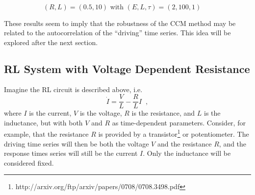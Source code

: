 \documentclass[a4paper,11pt]{article}
\begin{document}
\begin{figure}[h!t]
\begin{subfigure}[b]{0.4\textwidth}
\caption{$(R,L) = (0.5,10)$ with $\left(E,L,\tau\right)=\left(2,100,1\right)$}
\end{subfigure}
\caption{}
\end{figure}
 
These results seem to imply that the robustness of the CCM method may be related to the autocorrelation of the ``driving'' time series.  This idea will be explored after the next section.

\subsection{RL System with Voltage Dependent Resistance}
Imagine the RL circuit is described above, i.e.\
$$
\dot{I} = \frac{V}{L} - \frac{R}{L} I\;\;,
$$
where $I$ is the current, $V$ is the voltage, $R$ is the resistance, and $L$ is the inductance, but with both $V$ and $R$ as time-dependent parameters.  Consider, for example, that the resistance $R$ is provided by a transistor\footnote{http://arxiv.org/ftp/arxiv/papers/0708/0708.3498.pdf} or potentiometer.  The driving time series will then be both the voltage $V$ and the resistance $R$, and the response times series will still be the current $I$.  Only the inductance will be considered fixed.
\end{document}
